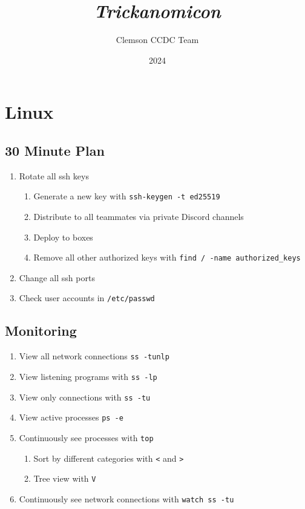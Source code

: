 \documentclass[12pt,letterpaper]{article}
\title{\huge{\textit{Trickanomicon}}}
\author{Clemson CCDC Team}
\date{2024}
\def\code#1{\textcolor{c2}{\texttt{#1}}}
\begin{document}
\maketitle

\pagebreak

\tableofcontents

\pagebreak

\section{Linux}

\subsection{30 Minute Plan}

\begin{enumerate}
	\item Rotate all ssh keys
		\begin{enumerate}
			\item Generate a new key with \code{ssh-keygen -t ed25519}
			\item Distribute to all teammates via private Discord channels
			\item Deploy to boxes
			\item Remove all other authorized keys with \code{find / -name authorized\_keys}
		\end{enumerate}
	\item Change all ssh ports
	\item Check user accounts in \code{/etc/passwd}
\end{enumerate}

\subsection{Monitoring}

\begin{enumerate}
	\item View all network connections \code{ss -tunlp}
	\item View listening programs with \code{ss -lp}
	\item View only connections with \code{ss -tu}
	\item View active processes \code{ps -e}
	\item Continuously see processes with \code{top}
		\begin{enumerate}
			\item Sort by different categories with \code{<} and \code{>}
			\item Tree view with \code{V}
		\end{enumerate}
	\item Continuously see network connections with \code{watch ss -tu}
\end{enumerate}
\end{document}
